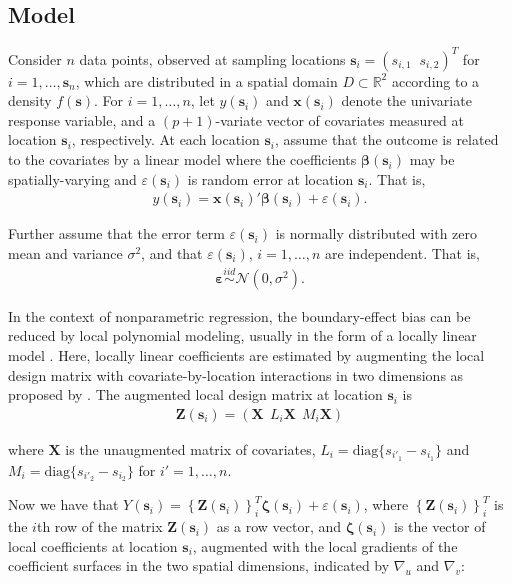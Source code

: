 \documentclass[authoryear, review, 11pt]{elsarticle}
\begin{document}
	\subsection{Model}	
	Consider $n$ data points, observed at sampling locations $\bm{s}_i = (s_{i,1} \;\; s_{i,2})^T$ for $i = 1, \dots, \bm{s}_n$, which are distributed in a spatial domain $D \subset \mathbb{R}^2$ according to a density $f(\bm{s})$. For $i = 1, \dots, n$, let $y(\bm{s}_i)$ and $\bm{x}(\bm{s}_i)$ denote the univariate response variable, and a $(p+1)$-variate vector of covariates measured at location $\bm{s}_i$, respectively. At each location $\bm{s}_i$, assume that the outcome is related to the covariates by a linear model where the coefficients $\bm{\beta}(\bm{s}_i)$ may be spatially-varying and $\varepsilon(\bm{s}_i)$ is random error at location $\bm{s}_i$. That is,
	\begin{align}\label{eq:lm(s)}
		y(\bm{s}_i) = \bm{x}(\bm{s}_i)' \bm{\beta}(\bm{s}_i) + \varepsilon(\bm{s}_i).
	\end{align}
	
	Further assume that the error term $\varepsilon(\bm{s}_i)$ is normally distributed with zero mean and variance $\sigma^2$, and that $\varepsilon(\bm{s}_i)$, $i=1, \dots, n$ are independent. That is,
	\begin{align} \label{eq:err}
		\bm{\varepsilon} \overset{iid}{\sim} \mathcal{N} \left( 0,\sigma^2 \right).
	\end{align}

    In the context of nonparametric regression, the boundary-effect bias can be reduced by local polynomial modeling, usually in the form of a locally linear model \citep{Fan-1996}. Here, locally linear coefficients are estimated by augmenting the local design matrix with covariate-by-location interactions in two dimensions as proposed by \cite{Wang:2008b}. The augmented local design matrix at location $\bm{s}_i$ is
    \begin{align}
		\bm{Z}(\bm{s}_i) = \left( \bm{X}  \:\: L_i \bm{X} \:\: M_i \bm{X} \right)
	\end{align} 
  
	where $\bm{X}$ is the unaugmented matrix of covariates, $L_i = \text{diag}\{s_{i'_1} - s_{i_1}\}$ and $M_i = \text{diag}\{s_{i'_2} - s_{i_2}\}$ for $i' = 1, \dots, n$.

    Now we have that $Y(\bm{s}_i) = \left\{ \bm{Z}(\bm{s}_i) \right\}^T_i \bm{\zeta}(\bm{s}_i) + \varepsilon(\bm{s}_i)$, where $\left\{ \bm{Z}(\bm{s}_i) \right\}^T_i$ is the $i$th row of the matrix $\bm{Z}(\bm{s}_i)$ as a row vector, and $\bm{\zeta}(\bm{s}_i)$ is the vector of local coefficients at location $\bm{s}_i$, augmented with the local gradients of the coefficient surfaces in the two spatial dimensions, indicated by $\nabla_u$ and $\nabla_v$:
\end{document}
